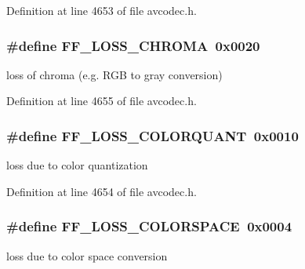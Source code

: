 Definition at line 4653 of file avcodec.\+h.

\subsubsection[{\texorpdfstring{F\+F\+\_\+\+L\+O\+S\+S\+\_\+\+C\+H\+R\+O\+MA}{FF_LOSS_CHROMA}}]{\setlength{\rightskip}{0pt plus 5cm}\#define F\+F\+\_\+\+L\+O\+S\+S\+\_\+\+C\+H\+R\+O\+MA~0x0020}\hypertarget{group__lavc__misc__pixfmt_ga769162ddb5b87080ab7a39291837f832}{}\label{group__lavc__misc__pixfmt_ga769162ddb5b87080ab7a39291837f832}
loss of chroma (e.\+g. R\+GB to gray conversion) 

Definition at line 4655 of file avcodec.\+h.

\subsubsection[{\texorpdfstring{F\+F\+\_\+\+L\+O\+S\+S\+\_\+\+C\+O\+L\+O\+R\+Q\+U\+A\+NT}{FF_LOSS_COLORQUANT}}]{\setlength{\rightskip}{0pt plus 5cm}\#define F\+F\+\_\+\+L\+O\+S\+S\+\_\+\+C\+O\+L\+O\+R\+Q\+U\+A\+NT~0x0010}\hypertarget{group__lavc__misc__pixfmt_gae4dedba75cbb41704ce6794f966f10a6}{}\label{group__lavc__misc__pixfmt_gae4dedba75cbb41704ce6794f966f10a6}
loss due to color quantization 

Definition at line 4654 of file avcodec.\+h.

\subsubsection[{\texorpdfstring{F\+F\+\_\+\+L\+O\+S\+S\+\_\+\+C\+O\+L\+O\+R\+S\+P\+A\+CE}{FF_LOSS_COLORSPACE}}]{\setlength{\rightskip}{0pt plus 5cm}\#define F\+F\+\_\+\+L\+O\+S\+S\+\_\+\+C\+O\+L\+O\+R\+S\+P\+A\+CE~0x0004}\hypertarget{group__lavc__misc__pixfmt_ga4701dd352b2a194eaed493399ccdca47}{}\label{group__lavc__misc__pixfmt_ga4701dd352b2a194eaed493399ccdca47}
loss due to color space conversion 

